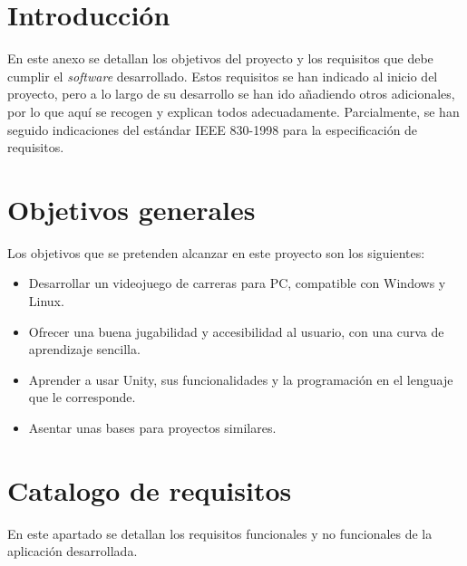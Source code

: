 
\section{Introducción}

En este anexo se detallan los objetivos del proyecto y los requisitos que debe cumplir el \textit{software} desarrollado. Estos requisitos se han indicado al inicio del proyecto, pero a lo largo de su desarrollo se han ido añadiendo otros adicionales, por lo que aquí se recogen y explican todos adecuadamente. Parcialmente, se han seguido indicaciones del estándar IEEE 830-1998 para la especificación de requisitos.

\section{Objetivos generales}

Los objetivos que se pretenden alcanzar en este proyecto son los siguientes:

\begin{itemize}
\tightlist
	\item Desarrollar un videojuego de carreras para PC, compatible con Windows y Linux.
	\item Ofrecer una buena jugabilidad y accesibilidad al usuario, con una curva de aprendizaje sencilla.
	\item Aprender a usar Unity, sus funcionalidades y la programación en el lenguaje que le corresponde.
	\item Asentar unas bases para proyectos similares.
\end{itemize}

\section{Catalogo de requisitos}

En este apartado se detallan los requisitos funcionales y no funcionales de la aplicación desarrollada.

